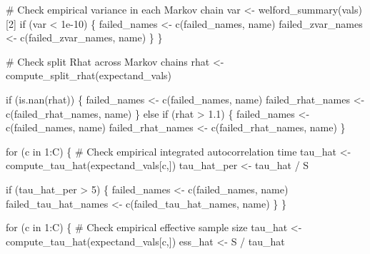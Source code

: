 \documentclass[
  letterpaper,
  DIV=11,
  numbers=noendperiod]{scrartcl}
\newenvironment{Shaded}{\begin{snugshade}}{\end{snugshade}}
\newcommand{\CommentTok}[1]{\textcolor[rgb]{0.37,0.37,0.37}{#1}}
\newcommand{\ControlFlowTok}[1]{\textcolor[rgb]{0.00,0.23,0.31}{#1}}
\newcommand{\DecValTok}[1]{\textcolor[rgb]{0.68,0.00,0.00}{#1}}
\newcommand{\FloatTok}[1]{\textcolor[rgb]{0.68,0.00,0.00}{#1}}
\newcommand{\KeywordTok}[1]{\textcolor[rgb]{0.00,0.23,0.31}{#1}}
\newcommand{\NormalTok}[1]{\textcolor[rgb]{0.00,0.23,0.31}{#1}}
\newcommand{\OperatorTok}[1]{\textcolor[rgb]{0.37,0.37,0.37}{#1}}
\begin{document}
\begin{Shaded}
\begin{Highlighting}[]
      \CommentTok{\# Check empirical variance in each Markov chain}
\NormalTok{      var }\OperatorTok{\textless{}{-}}\NormalTok{ welford\_summary(vals)[}\DecValTok{2}\NormalTok{]}
      \ControlFlowTok{if}\NormalTok{ (var }\OperatorTok{\textless{}} \FloatTok{1e{-}10}\NormalTok{) \{}
\NormalTok{        failed\_names }\OperatorTok{\textless{}{-}}\NormalTok{ c(failed\_names, name)}
\NormalTok{        failed\_zvar\_names }\OperatorTok{\textless{}{-}}\NormalTok{ c(failed\_zvar\_names, name) }
\NormalTok{      \}}
\NormalTok{    \}}

    \CommentTok{\# Check split Rhat across Markov chains}
\NormalTok{    rhat }\OperatorTok{\textless{}{-}}\NormalTok{ compute\_split\_rhat(expectand\_vals)}

    \ControlFlowTok{if}\NormalTok{ (}\KeywordTok{is}\NormalTok{.nan(rhat)) \{}
\NormalTok{      failed\_names }\OperatorTok{\textless{}{-}}\NormalTok{ c(failed\_names, name)}
\NormalTok{      failed\_rhat\_names }\OperatorTok{\textless{}{-}}\NormalTok{ c(failed\_rhat\_names, name)}
\NormalTok{    \} }\ControlFlowTok{else} \ControlFlowTok{if}\NormalTok{ (rhat }\OperatorTok{\textgreater{}} \FloatTok{1.1}\NormalTok{) \{}
\NormalTok{      failed\_names }\OperatorTok{\textless{}{-}}\NormalTok{ c(failed\_names, name)}
\NormalTok{      failed\_rhat\_names }\OperatorTok{\textless{}{-}}\NormalTok{ c(failed\_rhat\_names, name)}
\NormalTok{    \}}

    \ControlFlowTok{for}\NormalTok{ (c }\KeywordTok{in} \DecValTok{1}\NormalTok{:C) \{}
      \CommentTok{\# Check empirical integrated autocorrelation time}
\NormalTok{      tau\_hat }\OperatorTok{\textless{}{-}}\NormalTok{ compute\_tau\_hat(expectand\_vals[c,])}
\NormalTok{      tau\_hat\_per }\OperatorTok{\textless{}{-}}\NormalTok{ tau\_hat }\OperatorTok{/}\NormalTok{ S}

      \ControlFlowTok{if}\NormalTok{ (tau\_hat\_per }\OperatorTok{\textgreater{}} \DecValTok{5}\NormalTok{) \{}
\NormalTok{        failed\_names }\OperatorTok{\textless{}{-}}\NormalTok{ c(failed\_names, name)}
\NormalTok{        failed\_tau\_hat\_names }\OperatorTok{\textless{}{-}}\NormalTok{ c(failed\_tau\_hat\_names, name)}
\NormalTok{      \}}
\NormalTok{    \}}

    \ControlFlowTok{for}\NormalTok{ (c }\KeywordTok{in} \DecValTok{1}\NormalTok{:C) \{}
      \CommentTok{\# Check empirical effective sample size}
\NormalTok{      tau\_hat }\OperatorTok{\textless{}{-}}\NormalTok{ compute\_tau\_hat(expectand\_vals[c,])}
\NormalTok{      ess\_hat }\OperatorTok{\textless{}{-}}\NormalTok{ S }\OperatorTok{/}\NormalTok{ tau\_hat}
      

\end{Highlighting}
\end{Shaded}
\end{document}
